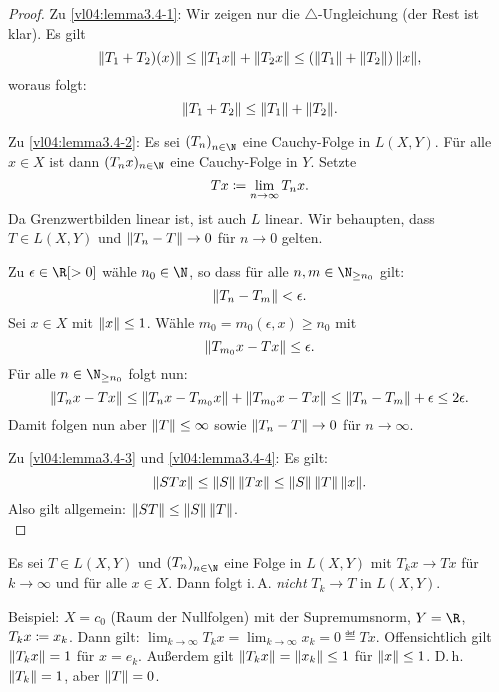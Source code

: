 \begin{proof}
    Zu \ref{vl04:lemma3.4-1}: Wir zeigen nur die $\triangle$-Ungleichung (der
    Rest ist klar). Es gilt
    \[ \lVert T_1+T_2)(x)\rVert \leq \lVert T_1x\rVert + \lVert T_2x\rVert
        \leq (\lVert T_1\rVert+\lVert T_2\rVert) \, \lVert x\rVert
    , \]
    woraus folgt:
    \[ \lVert T_1+T_2\rVert \leq \lVert T_1\rVert + \lVert T_2\rVert  . \]
    
    Zu \ref{vl04:lemma3.4-2}: Es sei $\nSeq T$ eine Cauchy-Folge in $L(X,Y)$.
    Für alle $x\in X$ ist dann $(T_n x)_{n\in\N}$ eine Cauchy-Folge in $Y$.
    Setzte
    \[ Tx \coloneqq \lim_{n\to\infty} T_n x  . \]
    Da Grenzwertbilden linear ist, ist auch $L$ linear. Wir behaupten, dass
    $T\in L(X,Y)$ und $\lVert T_n-T\rVert\to0$ für $n\to0$ gelten.
    
    Zu $\epsilon\in\R[>0]$ wähle $n_0\in\N$, so dass für alle 
    $n,m\in\N_{\geq n_0}$ gilt:
    \[ \lVert T_n-T_m\rVert < \epsilon  .\]
    Sei $x\in X$ mit $\lVert x\rVert\leq 1$. Wähle $m_0=m_0(\epsilon,x) \geq n_0$ mit
    \[ \lVert T_{m_0} x - Tx\rVert \leq \epsilon . \]
    Für alle $n\in\N_{\geq n_0}$ folgt nun:
    \[ \lVert T_n x -Tx\rVert \leq \lVert T_n x - T_{m_0} x\rVert + \lVert T_{m_0} x - T x\rVert
        \leq \lVert T_n-T_m\rVert + \epsilon \leq 2\epsilon
    . \]
    Damit folgen nun aber $\lVert T\rVert \leq \infty$ sowie $\lVert T_n-T\rVert\to0$ für
    $n\to\infty$.
    
    Zu \ref{vl04:lemma3.4-3} und \ref{vl04:lemma3.4-4}: Es gilt:
    \[ \lVert STx\rVert \leq \lVert S\rVert \, \lVert Tx\rVert \leq \lVert S\rVert\,\lVert T\rVert\,\lVert x\rVert
    . \]
    Also gilt allgemein: $\lVert ST\rVert \leq \lVert S\rVert\,\lVert T\rVert$.
    \\
\end{proof}

\begin{thBemerkung}
    Es sei $T\in L(X,Y)$ und $\nSeq T$ eine Folge in $L(X,Y)$ mit $T_k x\to Tx$
    für $k\to\infty$ und für alle $x\in X$. Dann folgt i.\,A. \emph{nicht}
    $T_k\to T$ in $L(X,Y)$.
    
    Beispiel: $X=c_0$ (Raum der Nullfolgen) %
    mit der Supremumsnorm, $Y=\R$, $T_kx\coloneqq x_k$.
    Dann gilt: $\lim_{k\to\infty} T_kx = \lim_{k\to\infty} x_k = 0 \eqdef Tx$.
    Offensichtlich gilt $\lVert T_kx\rVert=1$ für $x=e_k$.
    Außerdem gilt $\lVert T_kx\rVert = \lVert x_k\rVert \leq 1$ für $\lVert x\rVert\leq 1$. D.\,h.
    $\lVert T_k\rVert=1$, aber $\lVert T\rVert=0$.
\end{thBemerkung}

